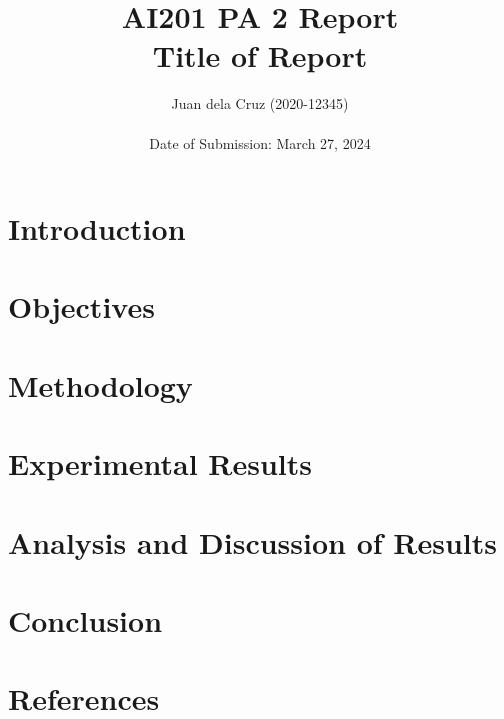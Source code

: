 \documentclass{acm_proc_article-sp}
\begin{document}
\title{AI201 PA 2 Report\\ Title of Report}

\author{
\alignauthor Juan dela Cruz (2020-12345)\\ %
~\\
Date of Submission: March 27, 2024
}

\maketitle


\section{Introduction}

\section{Objectives}

\section{Methodology}

\section{Experimental Results}

\section{Analysis and Discussion of Results}

\section{Conclusion}


\section{References}
\end{document}
